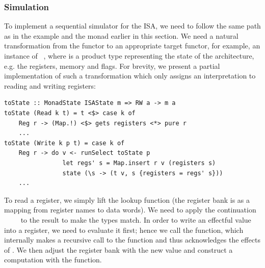 
\subsubsection{Simulation}

To implement a sequential simulator for the ISA, we need to follow the same path
as in the  example and the  monad earlier in this section.
We need a natural transformation from the functor  to an appropriate
target functor, for example, an instance of ~,
where  is a product type representing the state of the
architecture, e.g. the registers, memory and flags. For brevity, we present a
partial implementation of such a transformation which only assigns an
interpretation to reading and writing registers:

\vspace{1mm}
\begin{verbatim}
toState :: MonadState ISAState m => RW a -> m a
toState (Read k t) = t <$> case k of
    Reg r -> (Map.!) <$> gets registers <*> pure r
    ...
toState (Write k p t) = case k of
    Reg r -> do v <- runSelect toState p
                let regs' s = Map.insert r v (registers s)
                state (\s -> (t v, s {registers = regs' s}))
    ...
\end{verbatim}
\vspace{1mm}

To read a register, we simply lift the  lookup function (the
register bank is as a mapping from register names to data words). We need to
apply the continuation ~\hs{::}~~\hs{->}~ to the result
to make the types match. In order to write an effectful value  into a
register, we need to evaluate it first; hence we call the 
function, which internally makes a recursive call to the  function
and thus acknowledges the effects of . We then adjust the register bank
with the new value and construct a  computation with the
 function.

